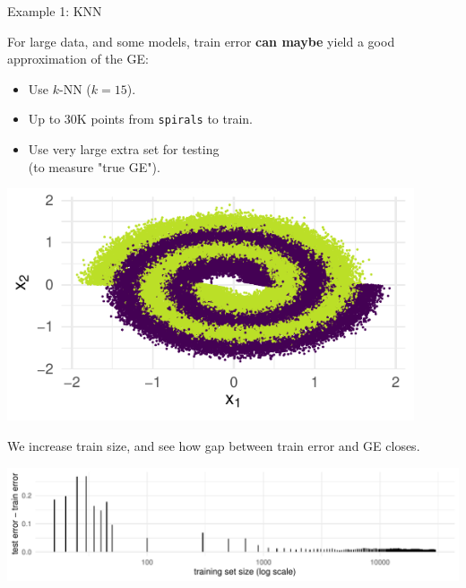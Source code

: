\begin{vbframe}{Example 1: KNN}

For large data, and some models, train error \textbf{can maybe} yield 
a good approximation of the GE:

\begin{minipage}[c]{0.6\textwidth}
\begin{itemize}
  \small
\item Use $k$-NN ($k = 15$).
\item Up to 30K points from \texttt{spirals} to train.
\item Use very large extra set for testing\\(to measure "true GE").
\end{itemize}
\end{minipage}%
\begin{minipage}[c]{0.05\textwidth}
  \phantom{foo}
\end{minipage}%
\begin{minipage}[c]{0.35\textwidth}
  \includegraphics[width = 0.9\textwidth]{figure/eval_delta_train_test_err_data}
\end{minipage}%

\vfill

\small


\vfill

We increase train size, and see how gap between train error and GE closes.

\vfill

\includegraphics[width = \textwidth]{figure/eval_delta_train_test_err}


\end{vbframe}
